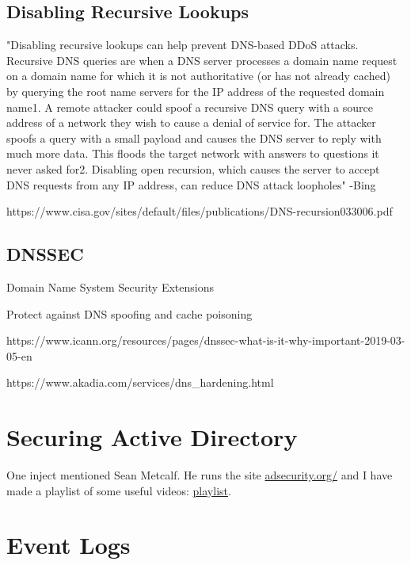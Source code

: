 \documentclass{article}
\begin{document}
\subsection{Disabling Recursive Lookups}
"Disabling recursive lookups can help prevent DNS-based DDoS attacks. 
Recursive DNS queries are when a DNS server processes a domain name 
request on a domain name for which it is not authoritative 
(or has not already cached) by querying the root name servers for 
the IP address of the requested domain name1. A remote attacker could 
spoof a recursive DNS query with a source address of a network they 
wish to cause a denial of service for. The attacker spoofs a query 
with a small payload and causes the DNS server to reply with much 
more data. This floods the target network with answers to questions 
it never asked for2. Disabling open recursion, which causes the server 
to accept DNS 
requests from any IP address, can reduce DNS attack loopholes" -Bing

https://www.cisa.gov/sites/default/files/publications/DNS-recursion033006.pdf

\subsection{DNSSEC}
Domain Name System Security Extensions

Protect against DNS spoofing and cache poisoning

https://www.icann.org/resources/pages/dnssec-what-is-it-why-important-2019-03-05-en

https://www.akadia.com/services/dns\_hardening.html

\section{Securing Active Directory}

One inject mentioned Sean Metcalf.
He runs the site \href{https://adsecurity.org/}{adsecurity.org/}
and I have made a playlist of some useful videos: \href{https://www.youtube.com/playlist?list=PLHkV-wwoQ7s_7vUau-eqiscWoZZNC3EcZ}{playlist}.

\section{Event Logs}
\end{document}

